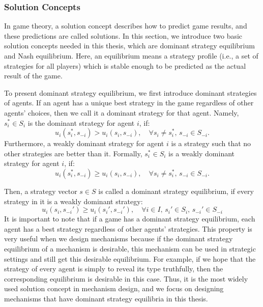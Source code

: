 \documentclass[11pt]{phdthesis}
\begin{document}

\subsubsection{Solution Concepts} \label{solution concepts}

In game theory, a solution concept describes how to predict game results, and these predictions are called solutions. In this section, we introduce two basic solution concepts needed in this thesis, which are dominant strategy equilibrium and Nash equilibrium. Here, an equilibrium means a strategy profile (i.e., a set of strategies for all players) which is stable enough to be predicted as the actual result of the game. 

To present dominant strategy equilibrium, we first introduce dominant strategies of agents. If an agent has a unique best strategy in the game regardless of other agents' choices, then we call it a dominant strategy for that agent. Namely, $s_i^* \in S_i$ is the dominant strategy for agent $i$, if: \[u_i(s_i^*,s_{-i}) > u_i(s_i,s_{-i}),\quad  \forall s_i \neq s_i^* ,\,  s_{-i} \in S_{-i}.\]
Furthermore, a weakly dominant strategy for agent $i$ is a strategy such that no other strategies are better than it. Formally, $s_i^* \in S_i$ is a weakly dominant strategy for agent $i$, if: 
\[u_i(s_i^*,s_{-i}) \geq u_i(s_i,s_{-i}),\quad \forall s_i \neq s_i^* ,\,  s_{-i} \in S_{-i}.\] 

Then, a strategy vector $ s \in S $ is called a dominant strategy equilibrium, if every strategy in it is a weakly dominant strategy:
\[u_i(s_i,s_{-i}') \geq u_i(s_i',s_{-i}'),\quad \forall  i \in I ,\, s_i' \in S_i,\, s_{-i}' \in S_{-i}\] 
It is important to note that if a game has a dominant strategy equilibrium, each agent has a best strategy regardless of other agents' strategies. This property is very useful when we design mechanisms because if the dominant strategy equilibrium of a mechanism is desirable, this mechanism can be used in strategic settings and still get this desirable equilibrium. For example, if we hope that the strategy of every agent is simply to reveal its type truthfully, then the corresponding equilibrium is desirable in this case. Thus, it is the most widely used solution concept in mechanism design, and we focus on designing mechanisms that have dominant strategy equilibria in this thesis. 
\end{document}
